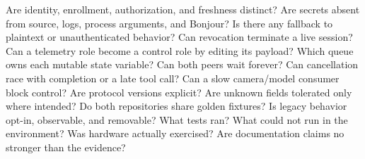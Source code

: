 \markdownRendererUlEnd \markdownRendererInterblockSeparator
{}
\markdownRendererSectionEnd \markdownRendererSectionBegin
{}\markdownRendererInterblockSeparator
{}\markdownRendererUlBegin
\markdownRendererUlItem Are identity, enrollment, authorization, and freshness distinct?\markdownRendererUlItemEnd 
\markdownRendererUlItem Are secrets absent from source, logs, process arguments, and Bonjour?\markdownRendererUlItemEnd 
\markdownRendererUlItem Is there any fallback to plaintext or unauthenticated behavior?\markdownRendererUlItemEnd 
\markdownRendererUlItem Can revocation terminate a live session?\markdownRendererUlItemEnd 
\markdownRendererUlItem Can a telemetry role become a control role by editing its payload?\markdownRendererUlItemEnd 
\markdownRendererUlEnd \markdownRendererInterblockSeparator
{}
\markdownRendererSectionEnd \markdownRendererSectionBegin
{}\markdownRendererInterblockSeparator
{}\markdownRendererUlBegin
\markdownRendererUlItem Which queue owns each mutable state variable?\markdownRendererUlItemEnd 
\markdownRendererUlItem Can both peers wait forever?\markdownRendererUlItemEnd 
\markdownRendererUlItem Can cancellation race with completion or a late tool call?\markdownRendererUlItemEnd 
\markdownRendererUlItem Can a slow camera/model consumer block control?\markdownRendererUlItemEnd 
\markdownRendererUlEnd \markdownRendererInterblockSeparator
{}
\markdownRendererSectionEnd \markdownRendererSectionBegin
{}\markdownRendererInterblockSeparator
{}\markdownRendererUlBegin
\markdownRendererUlItem Are protocol versions explicit?\markdownRendererUlItemEnd 
\markdownRendererUlItem Are unknown fields tolerated only where intended?\markdownRendererUlItemEnd 
\markdownRendererUlItem Do both repositories share golden fixtures?\markdownRendererUlItemEnd 
\markdownRendererUlItem Is legacy behavior opt-in, observable, and removable?\markdownRendererUlItemEnd 
\markdownRendererUlEnd \markdownRendererInterblockSeparator
{}
\markdownRendererSectionEnd \markdownRendererSectionBegin
{}\markdownRendererInterblockSeparator
{}\markdownRendererUlBegin
\markdownRendererUlItem What tests ran?\markdownRendererUlItemEnd 
\markdownRendererUlItem What could not run in the environment?\markdownRendererUlItemEnd 
\markdownRendererUlItem Was hardware actually exercised?\markdownRendererUlItemEnd 
\markdownRendererUlItem Are documentation claims no stronger than the evidence?\markdownRendererUlItemEnd 
\markdownRendererUlEnd \markdownRendererInterblockSeparator
